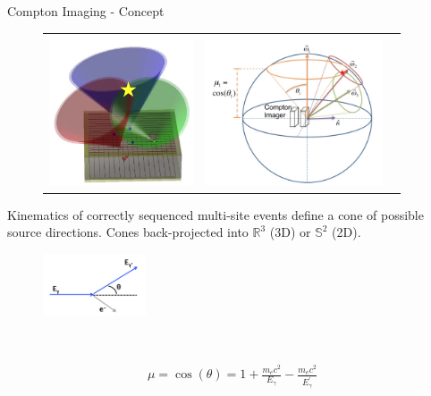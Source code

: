 \documentclass[xcolor=x11names,compress]{beamer}
\renewcommand{\(}{\begin{columns}}
\renewcommand{\)}{\end{columns}}
\newcommand{\<}[1]{\begin{column}{#1}}
\renewcommand{\>}{\end{column}}
\begin{document}
\begin{frame}{Compton Imaging - Concept}

\vspace{-10pt}

\begin{figure}
\begin{tabular}{ccc}
&& \cite{Haefner} \\[-3ex]
\includegraphics[height=1.7in]{Figures/Compton.png} & 
\includegraphics[height=1.7in]{Figures/Compton2.png} & 
\end{tabular}
\end{figure}

Kinematics of correctly sequenced multi-site events define a cone of possible source directions. Cones back-projected into $\mathbb{R}^3$ (3D) or $\mathbb{S}^2$ (2D).

\vspace{-25pt}

\begin{figure}
\includegraphics[width=1.2in]{Figures/ComptonKinematic.png} 
\end{figure}

\hfill\textcolor{white}{a}

\begin{align*}
\mu = \cos(\theta) = 1 + \frac{m_e c^2}{E_\gamma} - \frac{m_e c^2}{E_\gamma^\prime}
\end{align*}

\end{frame}
\end{document}
